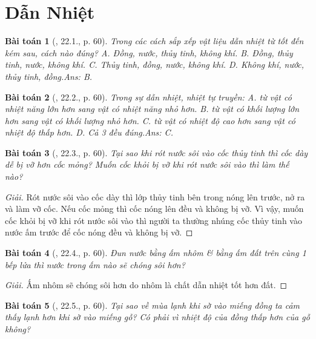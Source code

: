 \documentclass{article}
\newtheorem{baitoan}{Bài toán}
\begin{document}

\section{Dẫn Nhiệt}

\begin{baitoan}[\cite{SBT_Vat_Ly_8}, 22.1., p. 60]
	Trong các cách sắp xếp vật liệu dẫn nhiệt từ tốt đến kém sau, cách nào đúng? {\sf A.} Đồng, nước, thủy tinh, không khí. {\sf B.} Đồng, thủy tinh, nước, không khí. {\sf C.} Thủy tinh, đồng, nước, không khí. {\sf D.} Không khí, nước, thủy tinh, đồng.\hfill{\sf Ans: B.}
\end{baitoan}

\begin{baitoan}[\cite{SBT_Vat_Ly_8}, 22.2., p. 60]
	Trong sự dẫn nhiệt, nhiệt tự truyền: {\sf A.} từ vật có nhiệt năng lớn hơn sang vật có nhiệt năng nhỏ hơn. {\sf B.} từ vật có khối lượng lớn hơn sang vật có khối lượng nhỏ hơn. {\sf C.} từ vật có nhiệt độ cao hơn sang vật có nhiệt độ thấp hơn. {\sf D.} Cả 3 đều đúng.\hfill{\sf Ans: C.}
\end{baitoan}

\begin{baitoan}[\cite{SBT_Vat_Ly_8}, 22.3., p. 60]
	Tại sao khi rót nước sôi vào cốc thủy tinh thì cốc dày dễ bị vỡ hơn cốc mỏng? Muốn cốc khỏi bị vỡ khi rót nước sôi vào thì làm thế nào?
\end{baitoan}

\begin{proof}[Giải]
	Rót nước sôi vào cốc dày thì lớp thủy tinh bên trong nóng lên trước, nở ra và làm vỡ cốc. Nếu cốc mỏng thì cốc nóng lên đều và không bị vỡ. Vì vậy, muốn cốc khỏi bị vỡ khi rót nước sôi vào thì người ta thường nhúng cốc thủy tinh vào nước ấm trước để cốc nóng đều và không bị vỡ.
\end{proof}

\begin{baitoan}[\cite{SBT_Vat_Ly_8}, 22.4., p. 60]
	Đun nước bằng ấm nhôm \& bằng ấm đất trên cùng 1 bếp lửa thì nước trong ấm nào sẽ chóng sôi hơn?
\end{baitoan}

\begin{proof}[Giải]
	Ấm nhôm sẽ chóng sôi hơn do nhôm là chất dẫn nhiệt tốt hơn đất.
\end{proof}

\begin{baitoan}[\cite{SBT_Vat_Ly_8}, 22.5., p. 60]
	Tại sao về mùa lạnh khi sờ vào miếng đồng ta cảm thấy lạnh hơn khi sờ vào miếng gỗ? Có phải vì nhiệt độ của đồng thấp hơn của gỗ không?
\end{baitoan}
\end{document}
